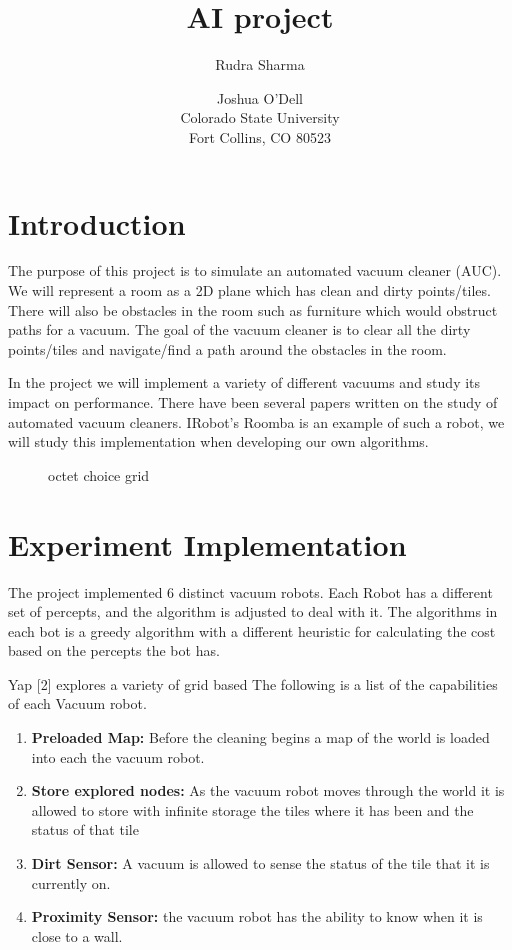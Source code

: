\documentclass[letterpaper]{article}
\title{AI project}
\author{Rudra Sharma \and Joshua O'Dell \\ Colorado State University \\ Fort Collins, CO 80523 }
\begin{document}
\maketitle

\section{Introduction}

The purpose of this project is to simulate an automated vacuum cleaner (AUC). We will represent a room as a 2D plane which has clean and dirty points/tiles. There will also be obstacles in the room such as furniture which would obstruct paths for a vacuum. The goal of the vacuum cleaner is to clear all the dirty points/tiles and navigate/find a path around the obstacles in the room.

In the project we will implement a variety of different vacuums and study its impact on performance. There have been several papers written on the study of automated vacuum cleaners. IRobot’s Roomba is an example of such a robot, we will study this implementation when developing our own algorithms.
\begin{figure}[h]
\caption{ octet choice grid}
\end{figure}
\section{Experiment Implementation}

The project implemented 6 distinct vacuum robots.  Each Robot has a different set of percepts, and the algorithm is adjusted to deal with it. The algorithms in each bot is a greedy algorithm with a different heuristic for calculating the cost based on the percepts the bot has. 

Yap [2] explores a variety of grid based
The following is a list of the capabilities of each Vacuum robot.
\begin{enumerate}  
\item \textbf{Preloaded Map:} Before the cleaning begins a map of the world is loaded into each the vacuum robot.
\item \textbf{Store explored nodes:} As the vacuum robot moves through the world it is allowed to store with infinite storage the tiles where it has been and the status of that tile
\item \textbf{Dirt Sensor:} A vacuum is allowed to sense the status of the tile that it is currently on.
\item \textbf{Proximity Sensor:} the vacuum robot has the ability to know when it is close to a wall.
\end{enumerate}  
\end{document}
